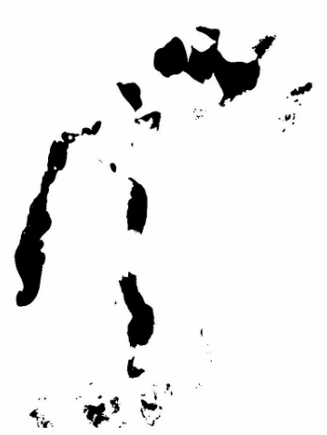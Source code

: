 \documentclass[12pt,a4paper]{article}
\begin{document}
\begin{figure}
\begin{subfigure}[b]{0.19\textwidth}
         \includegraphics[width=\textwidth]{../img/2015w.jpg}
         \caption{}
         \label{fig:}
     \end{subfigure}
     \begin{subfigure}[b]{0.19\textwidth}
         \centering

\end{subfigure}
\end{figure}
\end{document}
